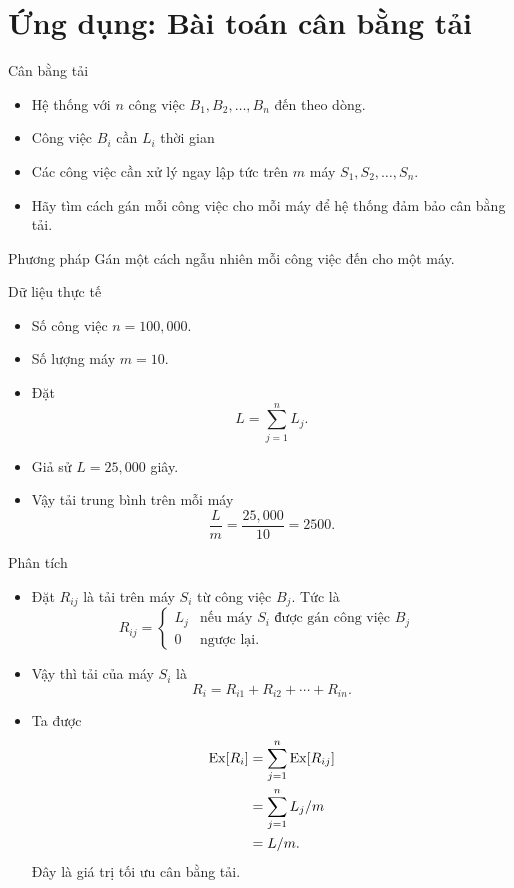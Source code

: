 \section{Ứng dụng: Bài toán cân bằng tải}
\begin{frame}
  \begin{block}{Cân bằng tải}
    \begin{itemize}
    \item Hệ thống với $n$ công việc $B_1, B_2, \dots, B_n$ đến theo dòng.
    \item Công việc $B_i$ cần $L_i$ thời gian
	 
	 \item  Các công việc cần xử lý ngay
      lập tức trên $m$ máy $S_1, S_2, \dots, S_n$.
    \item Hãy tìm cách gán mỗi công việc cho mỗi máy để hệ thống đảm bảo cân bằng tải.
    \end{itemize}
  \end{block}\pause 

  \begin{block}{Phương pháp}
    Gán một cách ngẫu nhiên mỗi công việc đến cho một máy.  
  \end{block}
\end{frame}

\begin{frame}{Dữ liệu thực tế}
	\begin{itemize}
		\item Số công việc $n = 100,000$.
		\item Số lượng máy $m = 10$. 
		\item Đặt $$L = \sum_{j=1}^{n} L_j.$$
		\item Giả sử $L = 25,000$ giây.
		
		\item Vậy tải trung bình trên mỗi máy 
		\[
			\frac{L}{m} = \frac{25,000}{10} = 2500.
		\]  
	\end{itemize}
\end{frame}
\begin{frame}{Phân tích}
  \begin{itemize}
  \item Đặt $R_{ij} $ là tải trên  máy $S_i$ từ công việc $B_j$. Tức là 
    $$
    R_{ij} = \begin{cases}
      L_j &\text{nếu máy $S_i$ được gán công việc $B_j$ }\\
      0 & \text{ngược lại.}
    \end{cases} 
    $$
  \item Vậy thì tải của máy $S_i$ là $$R_i =  R_{i1} + R_{i2} + \cdots + R_{in}.$$
  \item Ta được 
    \begin{align*}
		\mathrm{Ex}[R_i] &= \sum_{j=1}^{n} \mathrm{Ex}[R_{ij}] \\
		         &= \sum_{j=1}^n L_j/m\\
				 &= L/m.
    \end{align*}
	Đây là giá trị tối ưu cân bằng tải.
  \end{itemize}
\end{frame}

